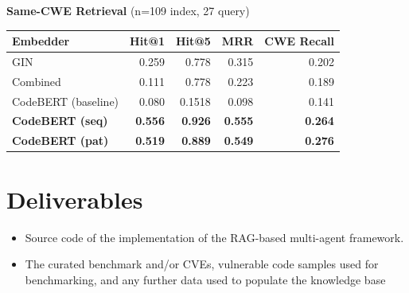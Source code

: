\documentclass[11pt, a4paper]{article}
\begin{document}
{\small\textbf{Same-CWE Retrieval} {\scriptsize(n=109 index, 27 query)}}\\[6pt]
  {\scriptsize
  \renewcommand{\arraystretch}{1.35}
  \setlength{\tabcolsep}{3.5pt}
    \begin{tabular}{lrrrr}
      \toprule
      \textbf{Embedder} & \textbf{Hit@1} & \textbf{Hit@5} & \textbf{MRR} & \textbf{CWE Recall} \\
      \midrule
      GIN & 0.259 & 0.778 & 0.315 & 0.202 \\
      \rowcolor{warn!12}
      Combined & 0.111 & 0.778 & 0.223 & 0.189 \\
      CodeBERT (baseline) & 0.080 & 0.1518 & 0.098 & 0.141 \\
      \rowcolor{hit!12}
      \textbf{CodeBERT (seq)} & \textbf{0.556} & \textbf{0.926} & \textbf{0.555} & \textbf{0.264} \\
      \textbf{CodeBERT (pat)} & \textbf{0.519} & \textbf{0.889} & \textbf{0.549} & \textbf{0.276} \\
      \bottomrule
    \end{tabular}
  }

\section*{Deliverables}
\begin{itemize}
    \item Source code of the implementation of the RAG-based multi-agent framework.
    \item The curated benchmark and/or CVEs, vulnerable code samples used for benchmarking, and any further data used to populate the knowledge base
\end{itemize}


\end{document}
